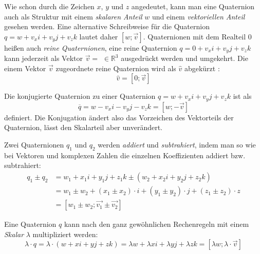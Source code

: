 Wie schon durch die Zeichen $x$, $y$ und $z$ angedeutet, kann man eine Quaternion auch als Struktur mit einem \emph{skalaren Anteil} $w$ und einem \emph{vektoriellen Anteil}  gesehen werden. Eine alternative Schreibweise für die Quaternion $q = w + v_{x}i + v_{y}j + v_{z}k$ lautet daher $\left[w; \vec v \right]$. Quaternionen mit dem Realteil $0$ heißen auch \emph{reine Quaternionen}, eine reine Quaternion $q = 0 + v_{x}i + v_{y}j + v_{z}k$ kann jederzeit als Vektor $ \vec v =$  $\in \mathbb R^3$ ausgedrückt werden und umgekehrt. Die einem Vektor $\vec v$ zugeordnete reine Quaternion wird als $\hat{v}$ abgekürzt :
\begin{equation}
 \hat{v} = \left[ 0; \vec v \right]
\end{equation} 

Die konjugierte Quaternion zu einer Quaternion $q = w + v_{x}i + v_{y}j + v_{z}k$ ist als
\begin{equation}
 \overline{q} = w - v_{x}i - v_{y}j - v_{z}k = \left[ w; -\vec v \right]
\end{equation}
definiert. Die Konjugation ändert also das Vorzeichen des Vektorteils der Quaternion, lässt den Skalarteil aber unverändert.

Zwei Quaternionen $q_1$ und $q_2$ werden \emph{addiert} und \emph{subtrahiert}, indem man so wie bei Vektoren und komplexen Zahlen die einzelnen Koeffizienten addiert bzw. subtrahiert:
\begin{equation}
\begin{split}
 q_1 \pm q_2 &= w_1 + x_{1}i + y_{1}j + z_{1}k \pm \left( w_2 + x_{2}i + y_{2}j + z_{2}k \right) \\
 &= w_1 \pm w_2 + \left( x_1 \pm x_2 \right) \cdot i + \left( y_1 \pm y_2 \right) \cdot j + \left( z_1 \pm z_2 \right) \cdot z \\
 &= \left[ w_1 \pm w_2; \vec{v_1} \pm \vec{v_2} \right]
\end{split}
\end{equation}

Eine Quaternion $q$ kann nach den ganz gewöhnlichen Rechenregeln mit einem \emph{Skalar} $\lambda$ multipliziert werden:
\begin{equation}
 \lambda \cdot q = \lambda \cdot (w + xi + yj + zk) = \lambda w + \lambda xi + \lambda yj + \lambda zk = \left[ \lambda w; \lambda \cdot \vec v \right]
\end{equation}

